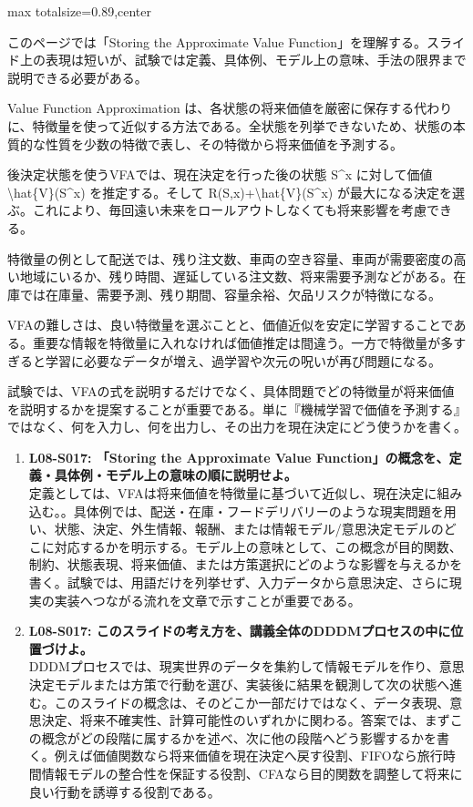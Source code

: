 \begin{minipage}[t]{0.58\textwidth}
\begin{adjustbox}{max totalsize={\textwidth}{0.89\textheight},center}
\begin{minipage}{\textwidth}\scriptsize
{}このページでは「Storing the Approximate Value Function」を理解する。スライド上の表現は短いが、試験では定義、具体例、モデル上の意味、手法の限界まで説明できる必要がある。\par
Value Function Approximation は、各状態の将来価値を厳密に保存する代わりに、特徴量を使って近似する方法である。全状態を列挙できないため、状態の本質的な性質を少数の特徴で表し、その特徴から将来価値を予測する。\par
後決定状態を使うVFAでは、現在決定を行った後の状態 S\textasciicircum{}x に対して価値 \textbackslash{}hat\{V\}(S\textasciicircum{}x) を推定する。そして R(S,x)+\textbackslash{}hat\{V\}(S\textasciicircum{}x) が最大になる決定を選ぶ。これにより、毎回遠い未来をロールアウトしなくても将来影響を考慮できる。\par
特徴量の例として配送では、残り注文数、車両の空き容量、車両が需要密度の高い地域にいるか、残り時間、遅延している注文数、将来需要予測などがある。在庫では在庫量、需要予測、残り期間、容量余裕、欠品リスクが特徴になる。\par
VFAの難しさは、良い特徴量を選ぶことと、価値近似を安定に学習することである。重要な情報を特徴量に入れなければ価値推定は間違う。一方で特徴量が多すぎると学習に必要なデータが増え、過学習や次元の呪いが再び問題になる。\par
試験では、VFAの式を説明するだけでなく、具体問題でどの特徴量が将来価値を説明するかを提案することが重要である。単に『機械学習で価値を予測する』ではなく、何を入力し、何を出力し、その出力を現在決定にどう使うかを書く。\par{}\begin{enumerate}\item \textbf{L08-S017: 「Storing the Approximate Value Function」の概念を、定義・具体例・モデル上の意味の順に説明せよ。}\\定義としては、VFAは将来価値を特徴量に基づいて近似し、現在決定に組み込む。。具体例では、配送・在庫・フードデリバリーのような現実問題を用い、状態、決定、外生情報、報酬、または情報モデル/意思決定モデルのどこに対応するかを明示する。モデル上の意味として、この概念が目的関数、制約、状態表現、将来価値、または方策選択にどのような影響を与えるかを書く。試験では、用語だけを列挙せず、入力データから意思決定、さらに現実の実装へつながる流れを文章で示すことが重要である。\item \textbf{L08-S017: このスライドの考え方を、講義全体のDDDMプロセスの中に位置づけよ。}\\DDDMプロセスでは、現実世界のデータを集約して情報モデルを作り、意思決定モデルまたは方策で行動を選び、実装後に結果を観測して次の状態へ進む。このスライドの概念は、そのどこか一部だけではなく、データ表現、意思決定、将来不確実性、計算可能性のいずれかに関わる。答案では、まずこの概念がどの段階に属するかを述べ、次に他の段階へどう影響するかを書く。例えば価値関数なら将来価値を現在決定へ戻す役割、FIFOなら旅行時間情報モデルの整合性を保証する役割、CFAなら目的関数を調整して将来に良い行動を誘導する役割である。\end{enumerate}

\end{minipage}
\end{adjustbox}
\end{minipage}
